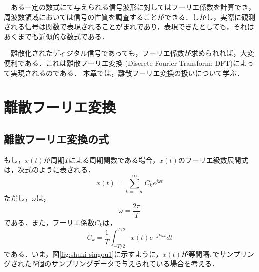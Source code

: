 
\begin{lead}
　ある一定の数式にて与えられる信号波形に対してはフーリエ係数を計算でき，周波数領域においては信号の性質を調査することができる．しかし，実際に観測される信号は関数で表現されることがまれであり，表現できたとしても，それはあくまでも近似的な数式である．

　離散化されたディジタル信号であっても，フーリエ係数が求められれば，大変便利である．これは離散フーリエ変換 (Discrete Fourier Transform: DFT)によって実現されるのである．
%
本章では，離散フーリエ変換の扱いについて学ぶ．


\end{lead}




\chapter{離散フーリエ変換}

\label{chapter:dft}


\section{離散フーリエ変換の式}

もし，$x(t)$が周期$T$による周期関数である場合，$x(t)$のフーリエ級数展開式は，次式のように表される．
\begin{equation}
x(t)=\sum^{\infty}_{k=-\infty}C_k e^{j\omega t}
\label{eqn:invdft1}
\end{equation}
ただし，$\omega$は，
\begin{equation}
\omega = \frac{2\pi}{T}
\end{equation}
である．また，フーリエ係数$C_k$は，
\begin{equation}
C_k = \frac{1}{T} \int^{T/2}_{-T/2} x(t) e^{-jk\omega t}dt
\label{eqn:fourier-keisu-dft1}
\end{equation}
である．いま，図\ref{fig:shuki-singou1}に示すように，$x(t)$が等間隔$\tau$でサンプリングされた$N$個のサンプリングデータで与えられている場合を考える．

